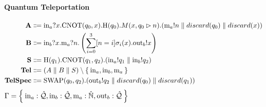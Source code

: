  
  
  
\paragraph{Quantum Teleportation}
\begin{align*}
  \text{\textbf{A}} &\Coloneqq \text{in}_a?x.\text{CNOT}(q_0, x).\text{H}(q_0).M(x,q_0 \rhd n).(\text{m}_a!n \parallel discard(q_0) \parallel discard(x) )\\
  \text{\textbf{B}} &\Coloneqq \text{in}_b?x.\text{m}_a?n.\left(\sum_{i = 0}^3 [n = i]\sigma_i(x).\text{out}_b!x\right) \\
  \text{\textbf{S}} &\Coloneqq \text{H}(q_1).\text{CNOT}(q_1, q_2).(\text{in}_a!q_1 \parallel \text{in}_b!q_2) \\
  \text{\textbf{Tel}} &\Coloneqq (A \parallel B \parallel S) \setminus \Set{\text{in}_a, \text{in}_b, \text{m}_a } \\
  \text{\textbf{TelSpec}} &\Coloneqq \text{SWAP}(q_0,q_2).(\text{out}_b!q_2 \parallel discard(q_0) \parallel discard(q_1))
\end{align*}
$\Gamma = \Set{\text{in}_a : \hat{\mathcal{Q}}, \text{in}_b : \hat{\mathcal{Q}}, \text{m}_a : \hat{\mathbb{N}}, \text{out}_b : \hat{\mathcal{Q}}}$